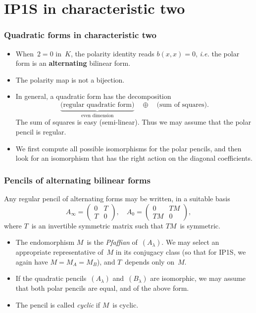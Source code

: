 \documentclass{beamer}%
\def\strong#1{{\bf\color{rouge}#1}}
\def\emphz#1{\emph{{\color{bleu}#1}}}
\def\mat#1{\begin{pmatrix}#1\end{pmatrix}}
\begin{document}
\section{IP1S in characteristic two}
\begin{frame}\frametitle{Quadratic forms in characteristic two}%
\begin{itemize}
\item When~$2 = 0$ in~$K$, the polarity identity reads $b(x,x) = 0$,
\emph{i.e.} the polar form is an \strong{alternating} bilinear form.
\item The polarity map is not a bijection.
\item In general, a quadratic form has the decomposition
\begin{equation*}
\underbrace{\text{(regular quadratic form)}}_{\text{even dimension}}
\quad⊕\quad {\text{(sum of squares)}}.
\end{equation*}
The sum of squares is easy (semi-linear). Thus we may assume that the
polar pencil is regular.
\item We first compute all possible isomorphisms for the polar pencils,
and then look for an isomorphism that has the right action on the
diagonal coefficients.
\end{itemize}
\end{frame}%
\begin{frame}\frametitle{Pencils of alternating bilinear forms}%
\begin{theorem}
Any regular pencil of alternating forms may be written, in a
suitable basis
\begin{equation*}
A_{∞} = \mat{0 & T\\T & 0}, \quad A_{0} = \mat{0 & TM\\TM & 0},
\end{equation*}
where $T$~is an invertible symmetric matrix such that $TM$~is symmetric.
\end{theorem}
\begin{itemize}
\item The endomorphism $M$~is the \emphz{Pfaffian} of~$(A_{λ})$. We may
select an appropriate representative of~$M$ in its conjugacy class (so
that for IP1S, we again have $M = M_A = M_B$), and $T$~depends only
on~$M$.
\item If the quadratic pencils~$(A_{λ})$ and~$(B_{λ})$ are isomorphic, we
may assume that both polar pencils are equal, and of the above form.
\item The pencil is called \emphz{cyclic} if $M$~is cyclic.
\end{itemize}
\end{frame}%
\end{document}
